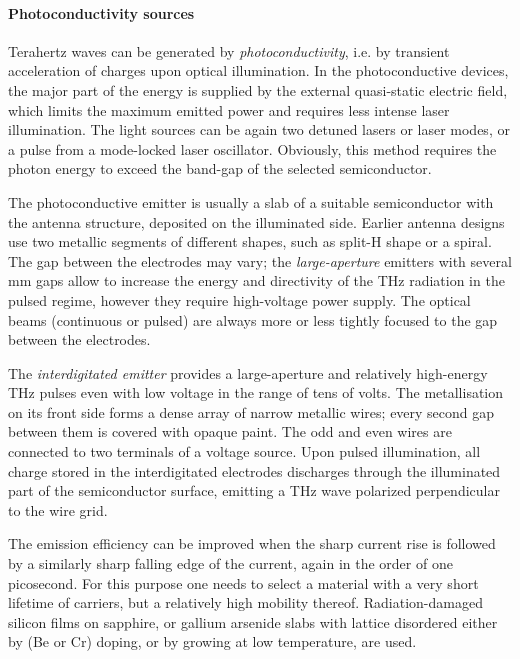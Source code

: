 \paragraph{Photoconductivity sources}%
Terahertz waves can be generated by \textit{photoconductivity}, i.e. by transient acceleration of charges upon optical illumination.
In the photoconductive devices, the major part of the energy is supplied by the external quasi-static electric field, which limits the maximum emitted power and requires less intense laser illumination. The light sources can be again two detuned lasers or laser modes\cite{gu1999generation}, or a pulse from a mode-locked laser oscillator. Obviously, this method requires the photon energy to exceed the band-gap of the selected semiconductor.

The photoconductive emitter is usually a slab of a suitable semiconductor with the antenna structure, deposited on the illuminated side.\cite{auston1984picosecond} Earlier antenna designs use two metallic segments of different shapes, such as split-H shape or a spiral. The gap between the electrodes may vary; the \textit{large-aperture} emitters with several mm gaps %
allow to increase the energy and directivity of the THz radiation in the pulsed regime, however they require high-voltage power supply.
The optical beams (continuous or pulsed) are always more or less tightly focused to the gap between the electrodes. 

The \textit{interdigitated emitter}\cite{darrow1990subpicosecond,hu1990optically} 
provides a large-aperture and relatively high-energy THz pulses even with low voltage in the range of tens of volts. The metallisation on its front side forms a dense array of narrow metallic wires; every second gap between them is covered with opaque paint. The odd and even wires are connected to two terminals of a voltage source.  Upon pulsed illumination, all charge stored in the interdigitated electrodes discharges through the illuminated part of the semiconductor surface, emitting a THz wave polarized perpendicular to the wire grid.

The emission efficiency can be improved when the sharp current rise is followed by a similarly sharp falling edge of the current, again in the order of one picosecond. For this purpose one needs to select a material with a very short lifetime of carriers, but a relatively high mobility thereof. Radiation-damaged silicon films on sapphire, or gallium arsenide slabs with lattice disordered either by (Be or Cr) doping, or by growing at low temperature, are used. 

